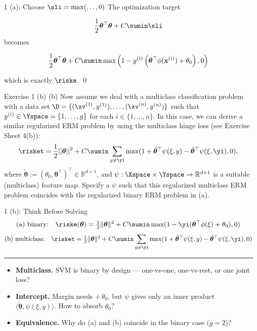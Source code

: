 \documentclass[aspectratio=169]{beamer}
\newcommand{\thetab}{\bm{\theta}}
\renewcommand{\phixi}{\phi(\xi)}
\newcommand{\thetabt}{\tilde{\thetab}}
\begin{document}
\begin{frame}{1 (a): Choose $\sli = \max(\ldots, 0) $ }
The optimization target 

$$
\frac{1}{2} \thetab^\top \thetab + C \sumin \sli
$$
becomes 

$$
\frac{1}{2} \thetab^\top \thetab + C \sumin \max\left(1 - y^{(i)} \left(\thetab^\top \phi(\mathbf{x}^{(i)}) + \theta_0 \right), 0 \right)
$$

which is exactly $\riske$. \qed
\end{frame}


\begin{frame}{Exercise 1 (b)}
	(b) Now assume we deal with a multiclass classification problem with a data set $\D = \{(\xv^{(1)}, y^{(1)}), \ldots, (\xv^{(n)}, y^{(n)})\}$ such that $y^{(i)} \in \Yspace = \{1, \ldots, g \}$ for each $i \in \{1, \ldots, n \}$. In this case, we can derive a similar regularized ERM problem by using the multiclass hinge loss (see Exercise Sheet 4(b)):
	$$\risket = \frac{1}{2} || \thetab||^2 + C \sumin \sum_{y\neq \yi} \max (1 + \thetabt^\top \psi (\xi, y) - \thetabt^\top \psi(\xi, \yi), 0), $$
	where $\thetabt := (\theta_0, \thetab^\top)^\top \in \mathbb{R}^{d + 1}$, and $\psi: \Xspace \times \Yspace \to \mathbb{R}^{d+1}$ is a suitable (multiclass) feature map. Specify a $\psi$ such that this regularized multiclass ERM problem coincides with the regularized binary ERM problem in (a).
\end{frame}

\begin{frame}{1 (b): Think Before Solving}
	\small
	\[ \text{(a) binary:}\quad \riske(\thetab) = \tfrac{1}{2}\|\thetab\|^2 + C\sumin \max(1 - \yi(\thetab^\top \phixi + \theta_0), 0) \]
	\[ \text{(b) multiclass:}\quad \risket = \tfrac{1}{2}\|\thetab\|^2 + C \sumin \sum_{y\neq \yi} \max(1 + \thetabt^\top \psi(\xi, y) - \thetabt^\top \psi(\xi, \yi), 0) \]
	\rule{\linewidth}{0.4pt}
	\vspace{4pt}
	\begin{itemize}
		\setlength{\itemsep}{8pt}
		\item<1-> \textbf{Multiclass.} SVM is binary by design --- one-vs-one, one-vs-rest, or one joint loss?
		\item<2-> \textbf{Intercept.} Margin needs $+\,\theta_0$, but $\psi$ gives only an inner product $\langle \thetabt, \psi(\xi, y) \rangle$. How to absorb $\theta_0$?
		\item<3-> \textbf{Equivalence.} Why do (a) and (b) coincide in the binary case ($g = 2$)?
	\end{itemize}
\end{frame}
\end{document}
